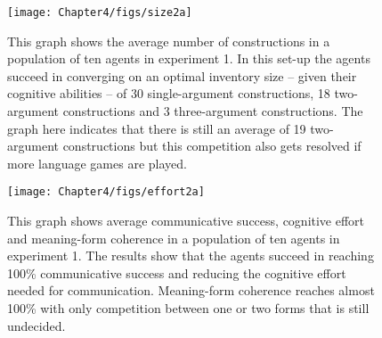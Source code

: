 \begin{figure}[tb]
\centerline{\texttt{[image: Chapter4/figs/size2a]}}
  \caption[Experiment 1: number of constructions with individual selection]{This graph shows the average number of constructions in a population of ten agents in experiment 1. In this set-up the agents succeed in converging on an optimal inventory size -- given their cognitive abilities -- of 30 single-argument constructions, 18 two-argument constructions and 3 three-argument constructions. The graph here indicates that there is still an average of 19 two-argument constructions but this competition also gets resolved if more language games are played.}
   \label{f:size1}
\end{figure}
\begin{figure}[htb]
\centerline{\texttt{[image: Chapter4/figs/effort2a]}}
  \caption[Experiment 1: success, effort and coherence]{This graph shows average communicative success, cognitive effort and meaning-form coherence in a population of ten agents in experiment 1. The results show that the agents succeed in reaching 100\% communicative success and reducing the cognitive effort needed for communication. Meaning-form coherence reaches almost 100\% with only competition between one or two forms that is still undecided.}
   \label{f:effort1}
\end{figure}

